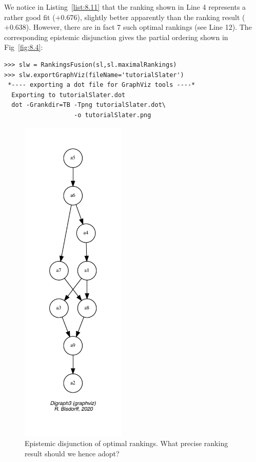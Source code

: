 We notice in Listing~\vref{list:8.11} that the \Slater ranking shown in Line 4 represents a rather good fit ($+0.676$), slightly better apparently than the \NetFlows ranking result ($+0.638$). However, there are in fact 7 such optimal \Slater rankings (see Line 12). The corresponding epistemic disjunction gives the partial ordering shown in Fig~\vref{fig:8.4}:
\begin{lstlisting}[caption={Computing the epistemic disjunction of optimal \Slater rankings},label=list:8.12]   
>>> slw = RankingsFusion(sl,sl.maximalRankings)
>>> slw.exportGraphViz(fileName='tutorialSlater')
 *---- exporting a dot file for GraphViz tools ----*
  Exporting to tutorialSlater.dot
  dot -Grankdir=TB -Tpng tutorialSlater.dot\
                   -o tutorialSlater.png
\end{lstlisting}
\begin{figure}[ht]
\sidecaption[t]
\includegraphics[width=5cm]{Figures/8-4-tutorialSlater.pdf}
\caption{Epistemic disjunction of optimal \Slater rankings. What precise \Slater ranking result should we hence adopt?}
\label{fig:8.4}       %
\end{figure}
       
